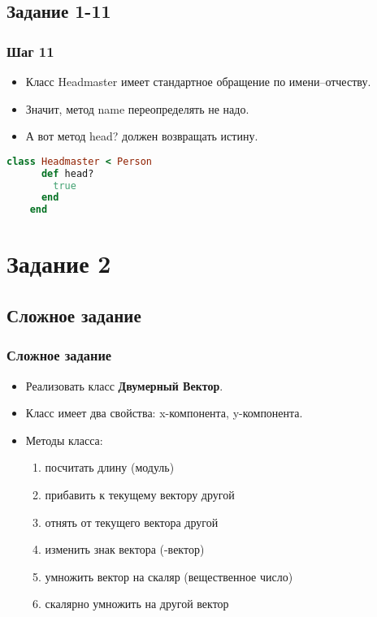 \documentclass[compress,red]{beamer}
\begin{document}
\subsection{Задание 1-11}
\begin{frame}[fragile]
  \frametitle{Шаг 11}
  \begin{itemize}
    \item Класс Headmaster имеет стандартное обращение по имени--отчеству.
    \item Значит, метод name переопределять не надо.
    \item А вот метод head? должен возвращать истину.
  \end{itemize}
  \scriptsize{
  \begin{lstlisting}[language=ruby,basicstyle=\footnotesize,label=ruby11,caption=Headmaster]
    class Headmaster < Person
      def head?
        true
      end
    end
  \end{lstlisting}
  }
  
\end{frame}

\section{Задание 2}

\subsection{Сложное задание}
\begin{frame}[fragile]
  \frametitle{Сложное задание}
  \begin{itemize}
    \item Реализовать класс \textbf{Двумерный Вектор}. 
    \item Класс имеет два свойства: x-компонента, y-компонента. 
    \item Методы класса:
      \begin{enumerate}
        \item посчитать длину (модуль)
        \item прибавить к текущему вектору другой
        \item отнять от текущего вектора другой
        \item изменить знак вектора (-вектор)
        \item умножить вектор на скаляр (вещественное число)
        \item скалярно умножить на другой вектор
      \end{enumerate}
  \end{itemize}
\end{frame}
\end{document}
